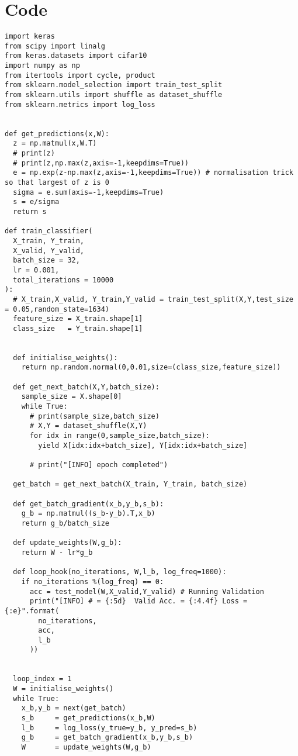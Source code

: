 \documentclass[10pt]{article}
\begin{document}
\section{Code}
\begin{verbatim}
import keras
from scipy import linalg
from keras.datasets import cifar10
import numpy as np
from itertools import cycle, product
from sklearn.model_selection import train_test_split
from sklearn.utils import shuffle as dataset_shuffle
from sklearn.metrics import log_loss


def get_predictions(x,W):
  z = np.matmul(x,W.T)
  # print(z)
  # print(z,np.max(z,axis=-1,keepdims=True))
  e = np.exp(z-np.max(z,axis=-1,keepdims=True)) # normalisation trick so that largest of z is 0
  sigma = e.sum(axis=-1,keepdims=True)
  s = e/sigma
  return s

def train_classifier(
  X_train, Y_train,
  X_valid, Y_valid, 
  batch_size = 32, 
  lr = 0.001, 
  total_iterations = 10000
):
  # X_train,X_valid, Y_train,Y_valid = train_test_split(X,Y,test_size = 0.05,random_state=1634)
  feature_size = X_train.shape[1]
  class_size   = Y_train.shape[1] 
  

  def initialise_weights():
    return np.random.normal(0,0.01,size=(class_size,feature_size))

  def get_next_batch(X,Y,batch_size):
    sample_size = X.shape[0]
    while True:
      # print(sample_size,batch_size)
      # X,Y = dataset_shuffle(X,Y)
      for idx in range(0,sample_size,batch_size):
        yield X[idx:idx+batch_size], Y[idx:idx+batch_size]
    
      # print("[INFO] epoch completed")

  get_batch = get_next_batch(X_train, Y_train, batch_size)
  
  def get_batch_gradient(x_b,y_b,s_b):
    g_b = np.matmul((s_b-y_b).T,x_b)
    return g_b/batch_size

  def update_weights(W,g_b):
    return W - lr*g_b

  def loop_hook(no_iterations, W,l_b, log_freq=1000):
    if no_iterations %(log_freq) == 0:
      acc = test_model(W,X_valid,Y_valid) # Running Validation
      print("[INFO] # = {:5d}  Valid Acc. = {:4.4f} Loss = {:e}".format(
        no_iterations,
        acc,
        l_b
      ))
      

  loop_index = 1
  W = initialise_weights()
  while True:
    x_b,y_b = next(get_batch)
    s_b     = get_predictions(x_b,W)
    l_b     = log_loss(y_true=y_b, y_pred=s_b) 
    g_b     = get_batch_gradient(x_b,y_b,s_b)
    W       = update_weights(W,g_b)


\end{verbatim}
\end{document}
